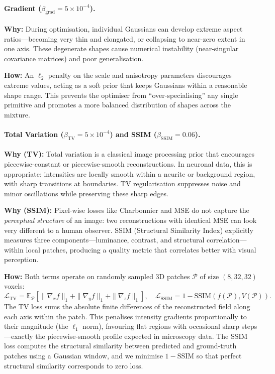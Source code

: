 \documentclass[11pt,a4paper]{article}
\begin{document}
\paragraph{Gradient ($\beta_{\text{grad}} = 5\times10^{-4}$).}
\textbf{Why:} During optimisation, individual Gaussians can develop extreme aspect ratios---becoming very thin and elongated, or collapsing to near-zero extent in one axis.  These degenerate shapes cause numerical instability (near-singular covariance matrices) and poor generalisation.

\textbf{How:} An $\ell_2$ penalty on the scale and anisotropy parameters discourages extreme values, acting as a soft prior that keeps Gaussians within a reasonable shape range.  This prevents the optimiser from ``over-specialising'' any single primitive and promotes a more balanced distribution of shapes across the mixture.

\paragraph{Total Variation ($\beta_{\text{TV}} = 5\times10^{-4}$) and SSIM ($\beta_{\text{SSIM}} = 0.06$).}
\textbf{Why (TV):} Total variation is a classical image processing prior that encourages piecewise-constant or piecewise-smooth reconstructions.  In neuronal data, this is appropriate: intensities are locally smooth within a neurite or background region, with sharp transitions at boundaries.  TV regularisation suppresses noise and minor oscillations while preserving these sharp edges.

\textbf{Why (SSIM):} Pixel-wise losses like Charbonnier and MSE do not capture the \emph{perceptual structure} of an image: two reconstructions with identical MSE can look very different to a human observer.  SSIM (Structural Similarity Index) explicitly measures three components---luminance, contrast, and structural correlation---within local patches, producing a quality metric that correlates better with visual perception.

\textbf{How:} Both terms operate on randomly sampled 3D patches $\mathcal{P}$ of size $(8, 32, 32)$ voxels:
\begin{equation}
\mathcal{L}_{\mathrm{TV}} = \mathbb{E}_{\mathcal{P}}\left[\|\nabla_x f\|_1 + \|\nabla_y f\|_1 + \|\nabla_z f\|_1\right], \quad
\mathcal{L}_{\mathrm{SSIM}} = 1 - \mathrm{SSIM}(f(\mathcal{P}), V(\mathcal{P})).
\label{eq:tv_ssim}
\end{equation}
The TV loss sums the absolute finite differences of the reconstructed field along each axis within the patch.  This penalises intensity gradients proportionally to their magnitude (the $\ell_1$ norm), favouring flat regions with occasional sharp steps---exactly the piecewise-smooth profile expected in microscopy data.  The SSIM loss computes the structural similarity between predicted and ground-truth patches using a Gaussian window, and we minimise $1 - \mathrm{SSIM}$ so that perfect structural similarity corresponds to zero loss.
\end{document}
